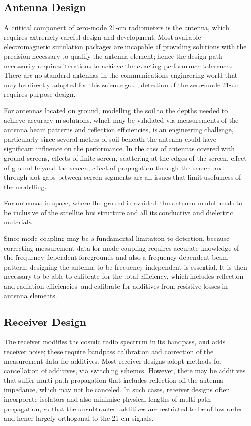 \subsection{Antenna Design}
A critical component of zero-mode 21-cm radiometers is the antenna, which requires extremely careful design and development. Most available electromagnetic simulation packages are incapable of providing solutions with the precision necessary to qualify the antenna element; hence the design path necessarily requires iterations to achieve the exacting performance tolerances.  There are no standard antennas in the communications engineering world that may be directly adopted for this science goal; detection of the zero-mode 21-cm requires purpose design.  

For antennas located on ground, modelling the soil to the depths needed to achieve accuracy in solutions, which may be validated via measurements of the antenna beam patterns and reflection efficiencies, is an engineering challenge, particularly since several metres of soil beneath the antenna could have significant influence on the performance.  In the case of antennas covered with ground screens, effects of finite screen, scattering at the edges of the screen,  effect of ground beyond the screen, effect of propagation through the screen and through slot gaps between screen segments are all issues that limit usefulness of the modelling.

For antennas in space, where the ground is avoided, the antenna model needs to be inclusive of the satellite bus structure and all its conductive and dielectric materials.

Since mode-coupling may be a fundamental limitation to detection, because correcting measurement data for mode coupling requires accurate knowledge of the frequency dependent foregrounds and also a frequency dependent beam pattern, designing the antenna to be frequency-independent is essential.  It is then necessary to be able to calibrate for the total efficiency, which includes reflection and radiation efficiencies, and calibrate for additives from resistive losses in antenna elements.

\subsection{Receiver Design}

The receiver modifies the cosmic radio spectrum in its bandpass, and adds receiver noise; these require bandpass calibration and correction of the measurement data for additives.  Most receiver designs adopt methods for cancellation of additives, via switching schemes.  However, there may be additives that suffer multi-path propagation that includes reflection off the antenna impedance, which may not be canceled.  In such cases, receiver designs often incorporate isolators and also minimise physical lengths of multi-path propagation, so that the unsubtracted additives are restricted to be of low order and hence largely orthogonal to the 21-cm signals.



